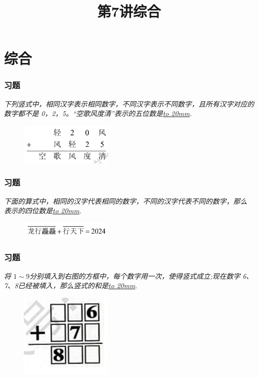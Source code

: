 \section{综合}

\title[第7讲\quad 综合]{第7讲\quad 综合} 
\author{}
\date{}

\begin{frame}
    \titlepage
\end{frame}

\setcounter{framecounter}{0}

\begin{frame}
    \frametitle{习题\theframecounter}
    \textit{下列竖式中，相同汉字表示相同数字，不同汉字表示不同数字，且所有汉字对应的数字都不是 0，2，5。“空歌风度清”表示的五位数是\underline{\hbox to 20mm{}}.}
    \begin{figure}[H] 
        \centering
        \includegraphics[width=0.4\textwidth]{./pics/Chapter_7/1.png}
    \end{figure}
\end{frame}

\begin{frame}
    \frametitle{习题\theframecounter}
    \textit{下面的算式中，相同的汉字代表相同的数字，不同的汉字代表不同的数字，那么  表示的四位数是\underline{\hbox to 20mm{}}.}
    \begin{figure}[H] 
        \centering
        \includegraphics[width=0.4\textwidth]{./pics/Chapter_7/2.png}
    \end{figure}
\end{frame}

\begin{frame}
    \frametitle{习题\theframecounter}
    \textit{将 $1\sim 9$分别填入到右图的方框中，每个数字用一次，使得竖式成立;现在数字 6、7、8已经被填入，那么竖式的和是\underline{\hbox to 20mm{}}.}
    \begin{figure}[H] 
        \centering
        \includegraphics[width=0.4\textwidth]{./pics/Chapter_7/3.png}
    \end{figure}
\end{frame}

